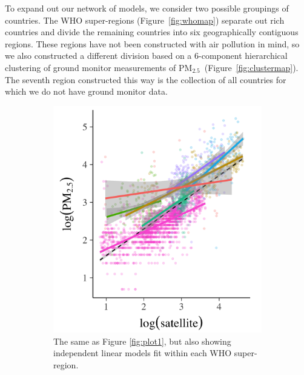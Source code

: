 \documentclass{statsoc}
\newcommand{\PM}{PM$_{2.5}$}
\begin{document}
To expand out our network of models, we consider two possible groupings of
countries. The WHO super-regions (Figure~\ref{fig:whomap}) separate out rich
countries and divide the remaining countries into six geographically contiguous
regions. These regions have not been constructed with air pollution in mind, so
we also constructed a different division based on a $6$-component hierarchical
clustering of ground monitor measurements of \PM\ (Figure~\ref{fig:clustermap}).
The seventh region constructed this way is the collection of all countries for
which we do not have ground monitor data.

\begin{figure}
\centering
\begin{subfigure}{0.48\textwidth}
\includegraphics[width=\textwidth]{plot2.png}
\caption{The same as Figure \ref{fig:plot1}, but also showing independent linear
models fit within each WHO super-region.}
\label{fig:plot2}
\end{subfigure}
~
\begin{subfigure}{0.48\textwidth}

\end{subfigure}
\end{figure}
\end{document}
